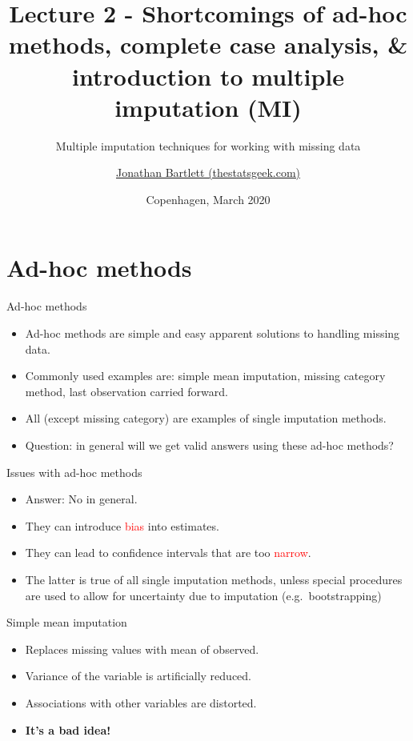 \documentclass[ignorenonframetext,]{beamer}
\title{Lecture 2 - Shortcomings of ad-hoc methods, complete case analysis, \&
introduction to multiple imputation (MI)}
\subtitle{Multiple imputation techniques for working with missing data}
\author{\href{https://thestatsgeek.com}{Jonathan Bartlett (thestatsgeek.com)}}
\date{Copenhagen, March 2020}
\providecommand{\tightlist}{%
  \setlength{\itemsep}{0pt}\setlength{\parskip}{0pt}}
\begin{document}
\frame{\titlepage}

\begin{frame}
\tableofcontents[hideallsubsections]
\end{frame}
\hypertarget{ad-hoc-methods}{%
\section{Ad-hoc methods}\label{ad-hoc-methods}}

\begin{frame}{Ad-hoc methods}
\protect\hypertarget{ad-hoc-methods-1}{}

\begin{itemize}
\tightlist
\item
  Ad-hoc methods are simple and easy apparent solutions to handling
  missing data.
\item
  Commonly used examples are: simple mean imputation, missing category
  method, last observation carried forward.
\item
  All (except missing category) are examples of single imputation
  methods.
\item
  Question: in general will we get valid answers using these ad-hoc
  methods?
\end{itemize}

\end{frame}

\begin{frame}{Issues with ad-hoc methods}
\protect\hypertarget{issues-with-ad-hoc-methods}{}

\begin{itemize}
\tightlist
\item
  Answer: No in general.
\item
  They can introduce \textcolor{red}{bias} into estimates.
\item
  They can lead to confidence intervals that are too
  \textcolor{red}{narrow}.
\item
  The latter is true of all single imputation methods, unless special
  procedures are used to allow for uncertainty due to imputation
  (e.g.~bootstrapping)
\end{itemize}

\end{frame}

\begin{frame}{Simple mean imputation}
\protect\hypertarget{simple-mean-imputation}{}

\begin{itemize}
\tightlist
\item
  Replaces missing values with mean of observed.
\item
  Variance of the variable is artificially reduced.
\item
  Associations with other variables are distorted.
\item
  \textbf{It's a bad idea!}
\end{itemize}

\end{frame}
\end{document}
